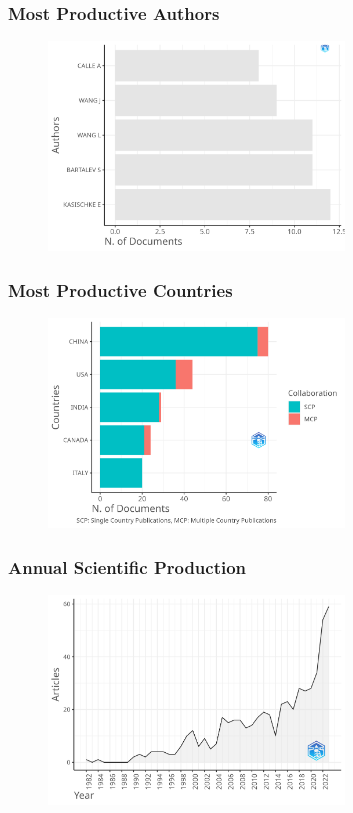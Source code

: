 \documentclass[aspectratio=169]{beamer}
\begin{document}
\begin{frame}
	\frametitle{Most Productive Authors}
	\begin{figure}
		\centering
		\includegraphics[width=0.7\textwidth]{figures/MostProdAuthors.png}
	\end{figure}
\end{frame}

\begin{frame}
	\frametitle{Most Productive Countries}
	\begin{figure}
		\centering
		\includegraphics[width=0.7\textwidth]{figures/MostProdCountries.png}
	\end{figure}
\end{frame}

\begin{frame}
	\frametitle{Annual Scientific Production}
	\begin{figure}
		\centering
		\includegraphics[width=0.7\textwidth]{figures/AnnualScientProd.png}
	\end{figure}
\end{frame}
\end{document}
